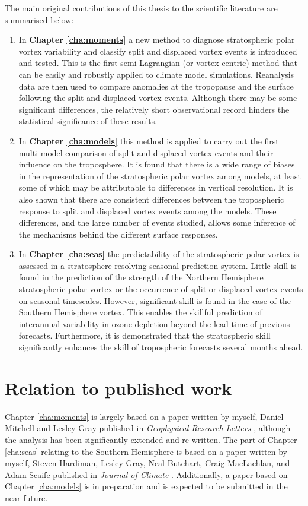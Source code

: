 The main original contributions of this thesis to the scientific literature are
summarised below:
\begin{enumerate}[1.]
\item In \textbf{Chapter \ref{cha:moments}} a new method to diagnose
  stratospheric polar vortex variability and classify split and displaced vortex
  events is introduced and tested. This is the first semi-Lagrangian (or
  vortex-centric) method that can be easily and robustly applied to climate
  model simulations. Reanalysis data are then used to compare anomalies at the
  tropopause and the surface following the split and displaced vortex
  events. Although there may be some significant differences, the relatively
  short observational record hinders the statistical significance of these
  results.

\item In \textbf{Chapter \ref{cha:models}} this method is applied to carry out
  the first multi-model comparison of split and displaced vortex events and
  their influence on the troposphere. It is found that there is a wide range of
  biases in the representation of the stratospheric polar vortex among models,
  at least some of which may be attributable to differences in vertical
  resolution. It is also shown that there are consistent differences between the
  tropospheric response to split and displaced vortex events among the
  models. These differences, and the large number of events studied, allows some
  inference of the mechanisms behind the different surface responses.

\item In \textbf{Chapter \ref{cha:seas}} the predictability of the stratospheric
  polar vortex is assessed in a stratosphere-resolving seasonal prediction
  system. Little skill is found in the prediction of the strength of the
  Northern Hemisphere stratospheric polar vortex or the occurrence of split or
  displaced vortex events on seasonal timescales. However, significant skill is
  found in the case of the Southern Hemisphere vortex. This enables the skillful
  prediction of interannual variability in ozone depletion beyond the lead time
  of previous forecasts. Furthermore, it is demonstrated that the stratospheric
  skill significantly enhances the skill of tropospheric forecasts several
  months ahead.

\end{enumerate}

\section{Relation to published work}
Chapter \ref{cha:moments} is largely based on a paper written by myself, Daniel
Mitchell and Lesley Gray published in \emph{Geophysical Research Letters}
\citep{Seviour2013}, although the analysis has been significantly extended and
re-written. The part of Chapter \ref{cha:seas} relating to the Southern
Hemisphere is based on a paper written by myself, Steven Hardiman, Lesley Gray,
Neal Butchart, Craig MacLachlan, and Adam Scaife published in \emph{Journal of
  Climate} \citep{Seviour2014}. Additionally, a paper based on Chapter
\ref{cha:models} is in preparation and is expected to be submitted in the near
future.

